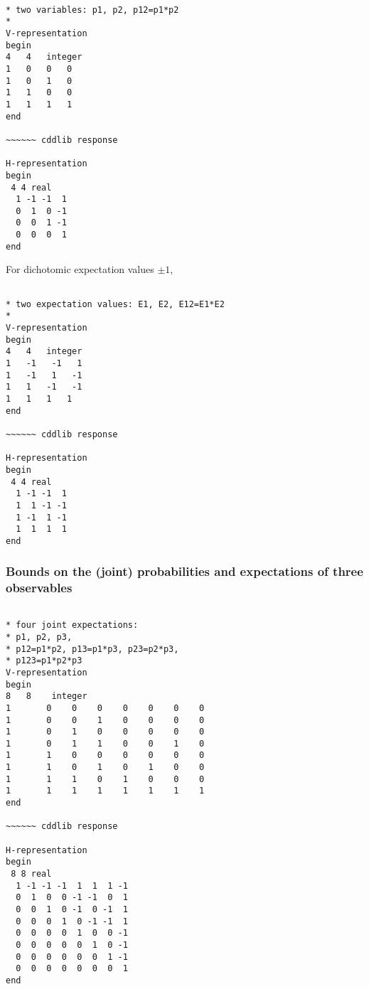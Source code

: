\documentclass[%
  twocolumn,
 showpacs,
 showkeys,
 preprintnumbers,
 amsmath,amssymb,
 aps,
  pra,
  longbibliography,
 floatfix,
 ]{revtex4-1}
\begin{document}
{ \begin{lstlisting}[backgroundcolor=\color{yellow!10},framerule=0pt,breaklines=true, frame=tb]

* two variables: p1, p2, p12=p1*p2
*
V-representation
begin
4   4   integer
1   0   0   0
1   0   1   0
1   1   0   0
1   1   1   1
end

~~~~~~ cddlib response

H-representation
begin
 4 4 real
  1 -1 -1  1
  0  1  0 -1
  0  0  1 -1
  0  0  0  1
end

\end{lstlisting}  }

For dichotomic expectation values $\pm 1$,
{ \begin{lstlisting}[backgroundcolor=\color{yellow!10},framerule=0pt,breaklines=true, frame=tb]

* two expectation values: E1, E2, E12=E1*E2
*
V-representation
begin
4   4   integer
1   -1   -1   1
1   -1   1   -1
1   1   -1   -1
1   1   1   1
end

~~~~~~ cddlib response

H-representation
begin
 4 4 real
  1 -1 -1  1
  1  1 -1 -1
  1 -1  1 -1
  1  1  1  1
end

\end{lstlisting}  }

\subsubsection{Bounds on the (joint) probabilities and expectations of three observables}
\label{2017-b-tevoa}


{ \begin{lstlisting}[backgroundcolor=\color{yellow!10},framerule=0pt,breaklines=true, frame=tb]

* four joint expectations:
* p1, p2, p3,
* p12=p1*p2, p13=p1*p3, p23=p2*p3,
* p123=p1*p2*p3
V-representation
begin
8   8    integer
1       0    0    0    0    0    0    0
1       0    0    1    0    0    0    0
1       0    1    0    0    0    0    0
1       0    1    1    0    0    1    0
1       1    0    0    0    0    0    0
1       1    0    1    0    1    0    0
1       1    1    0    1    0    0    0
1       1    1    1    1    1    1    1
end

~~~~~~ cddlib response

H-representation
begin
 8 8 real
  1 -1 -1 -1  1  1  1 -1
  0  1  0  0 -1 -1  0  1
  0  0  1  0 -1  0 -1  1
  0  0  0  1  0 -1 -1  1
  0  0  0  0  1  0  0 -1
  0  0  0  0  0  1  0 -1
  0  0  0  0  0  0  1 -1
  0  0  0  0  0  0  0  1
end

\end{lstlisting}  }
\end{document}
